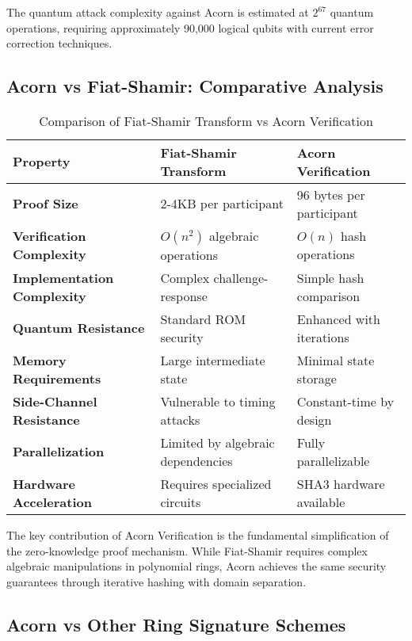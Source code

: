 \documentclass[11pt,a4paper]{article}
\begin{document}
The quantum attack complexity against Acorn is estimated at $2^{67}$ quantum operations, requiring approximately 90,000 logical qubits with current error correction techniques.

\subsection{Acorn vs Fiat-Shamir: Comparative Analysis}

\begin{table}[h]
\centering
\begin{tabular}{@{}lll@{}}
\toprule
Property & Fiat-Shamir Transform & Acorn Verification \\
\midrule
\textbf{Proof Size} & 2-4KB per participant & 96 bytes per participant \\
\textbf{Verification Complexity} & $O(n^2)$ algebraic operations & $O(n)$ hash operations \\
\textbf{Implementation Complexity} & Complex challenge-response & Simple hash comparison \\
\textbf{Quantum Resistance} & Standard ROM security & Enhanced with iterations \\
\textbf{Memory Requirements} & Large intermediate state & Minimal state storage \\
\textbf{Side-Channel Resistance} & Vulnerable to timing attacks & Constant-time by design \\
\textbf{Parallelization} & Limited by algebraic dependencies & Fully parallelizable \\
\textbf{Hardware Acceleration} & Requires specialized circuits & SHA3 hardware available \\
\bottomrule
\end{tabular}
\caption{Comparison of Fiat-Shamir Transform vs Acorn Verification}
\label{tab:acorn-vs-fiat-shamir}
\end{table}

The key contribution of Acorn Verification is the fundamental simplification of the zero-knowledge proof mechanism. While Fiat-Shamir requires complex algebraic manipulations in polynomial rings, Acorn achieves the same security guarantees through iterative hashing with domain separation.

\subsection{Acorn vs Other Ring Signature Schemes}
\end{document}
